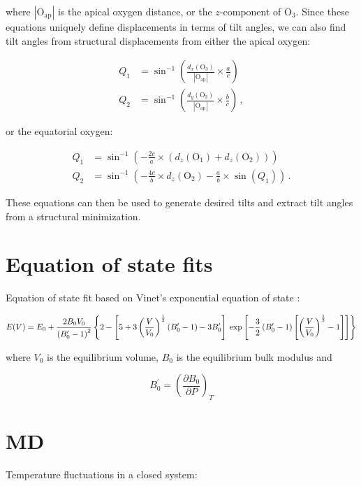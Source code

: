 \noindent where $| \text{O}_\text{ap} |$ is the apical oxygen distance, or the $z$-component of O$_3$. Since these equations uniquely define displacements in terms of tilt angles, we can also find tilt angles from structural displacements from either the apical oxygen:

\begin{align*}
Q_1 &= \sin^{-1} \left( \frac{d_x(\text{O}_3)}{| \text{O}_\text{ap} |} \times \frac{a}{c} \right) \\
Q_2 &= \sin^{-1} \left( \frac{d_y(\text{O}_3)}{| \text{O}_\text{ap} |} \times \frac{b}{c} \right) \, ,
\end{align*}

\noindent or the equatorial oxygen:

\begin{align*}
Q_1 &= \sin^{-1}  \left( - \frac{2c}{a} \times (d_z(\text{O}_1) + d_z(\text{O}_2)) \right) \\
Q_2 &= \sin^{-1}  \left( -\frac{4c}{b} \times d_z(\text{O}_2) - \frac{a}{b} \times \sin (Q_1) \right) \, .
\end{align*}

These equations can then be used to generate desired tilts and extract tilt angles from a structural minimization.

\section{Equation of state fits}

Equation of state fit based on Vinet's exponential equation of state \cite{Vinet1987}:

\begin{equation*}
\tiny
E(V) = E_0 + \frac{2B_0V_0}{\left(B_0^\prime-1\right)^2}\left\lbrace 2 -\left[ 5 + 3\left( \frac{V}{V_0}\right)^\frac{1}{3} (B_0^\prime -1)  -3B_0^\prime \right] \right. \left. \exp \left[ -\frac{3}{2} \left( B_0^\prime-1\right)\left[\left( \frac{V}{V_0}\right)^\frac{1}{3} -1\right]\right]\right\rbrace
\end{equation*}

\noindent where $V_0$ is the equilibrium volume, $B_0$ is the equilibrium bulk modulus and 

\begin{equation*}
    B_0^\prime = \left( \frac{\partial B_0}{\partial P}\right)_T
\end{equation*}

\section{MD}
Temperature fluctuations in a closed system:

